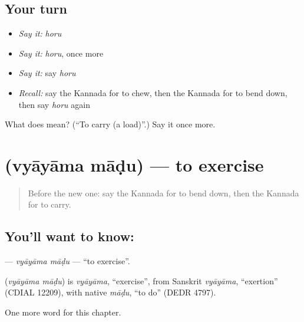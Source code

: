 \subsection*{Your turn}
\begin{itemize}
\raggedright
  \item \emph{Say it:} \emph{horu}
  \item \emph{Say it:} \emph{horu}, once more
  \item \emph{Say it:} say \emph{horu}
  \item \emph{Recall:} say the Kannada for to chew, then the Kannada for to bend down, then say \emph{horu} again
\end{itemize}

\begin{tcolorbox}[breakable,colback=teal!4,colframe=teal!35!black,title={Before you move on}]
What does  mean? (\textquotedblleft{}To carry (a load)\textquotedblright{}.) Say it once more.
\end{tcolorbox}
\section[\texorpdfstring{\kn{ವ್ಯಾಯಾಮ} \kn{ಮಾಡು} (vyāyāma māḍu)}{ವ್ಯಾಯಾಮ ಮಾಡು (vyāyāma māḍu)}]{  (vyāyāma māḍu) — to exercise}

\label{lesson:KA-C160-vyayama-madu}



\begin{quote}
Before the new one: say the Kannada for to bend down, then the Kannada for to carry.
\end{quote}

\subsection*{You'll want to know:  }
\textbf{ } — \emph{vyāyāma māḍu} — \textquotedblleft{}to exercise\textquotedblright{}.

\begin{cousinweb}
\textbf{ } (\emph{vyāyāma māḍu}) is \emph{vyāyāma}, \textquotedblleft{}exercise\textquotedblright{}, from Sanskrit \emph{vyāyāma}, \textquotedblleft{}exertion\textquotedblright{} (CDIAL 12209), with native \emph{māḍu}, \textquotedblleft{}to do\textquotedblright{} (DEDR 4797).
\end{cousinweb}

\begin{grammarlens}[title={What you've built}]
One more word for this chapter.
\end{grammarlens}

